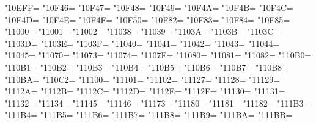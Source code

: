 \XeTeXcharclass"10EFF=\KclassCM
\XeTeXcharclass"10F46=\KclassCM
\XeTeXcharclass"10F47=\KclassCM
\XeTeXcharclass"10F48=\KclassCM
\XeTeXcharclass"10F49=\KclassCM
\XeTeXcharclass"10F4A=\KclassCM
\XeTeXcharclass"10F4B=\KclassCM
\XeTeXcharclass"10F4C=\KclassCM
\XeTeXcharclass"10F4D=\KclassCM
\XeTeXcharclass"10F4E=\KclassCM
\XeTeXcharclass"10F4F=\KclassCM
\XeTeXcharclass"10F50=\KclassCM
\XeTeXcharclass"10F82=\KclassCM
\XeTeXcharclass"10F83=\KclassCM
\XeTeXcharclass"10F84=\KclassCM
\XeTeXcharclass"10F85=\KclassCM
\XeTeXcharclass"11000=\KclassCM
\XeTeXcharclass"11001=\KclassCM
\XeTeXcharclass"11002=\KclassCM
\XeTeXcharclass"11038=\KclassCM
\XeTeXcharclass"11039=\KclassCM
\XeTeXcharclass"1103A=\KclassCM
\XeTeXcharclass"1103B=\KclassCM
\XeTeXcharclass"1103C=\KclassCM
\XeTeXcharclass"1103D=\KclassCM
\XeTeXcharclass"1103E=\KclassCM
\XeTeXcharclass"1103F=\KclassCM
\XeTeXcharclass"11040=\KclassCM
\XeTeXcharclass"11041=\KclassCM
\XeTeXcharclass"11042=\KclassCM
\XeTeXcharclass"11043=\KclassCM
\XeTeXcharclass"11044=\KclassCM
\XeTeXcharclass"11045=\KclassCM
\XeTeXcharclass"11070=\KclassCM
\XeTeXcharclass"11073=\KclassCM
\XeTeXcharclass"11074=\KclassCM
\XeTeXcharclass"1107F=\KclassCM
\XeTeXcharclass"11080=\KclassCM
\XeTeXcharclass"11081=\KclassCM
\XeTeXcharclass"11082=\KclassCM
\XeTeXcharclass"110B0=\KclassCM
\XeTeXcharclass"110B1=\KclassCM
\XeTeXcharclass"110B2=\KclassCM
\XeTeXcharclass"110B3=\KclassCM
\XeTeXcharclass"110B4=\KclassCM
\XeTeXcharclass"110B5=\KclassCM
\XeTeXcharclass"110B6=\KclassCM
\XeTeXcharclass"110B7=\KclassCM
\XeTeXcharclass"110B8=\KclassCM
\XeTeXcharclass"110BA=\KclassCM
\XeTeXcharclass"110C2=\KclassCM
\XeTeXcharclass"11100=\KclassCM
\XeTeXcharclass"11101=\KclassCM
\XeTeXcharclass"11102=\KclassCM
\XeTeXcharclass"11127=\KclassCM
\XeTeXcharclass"11128=\KclassCM
\XeTeXcharclass"11129=\KclassCM
\XeTeXcharclass"1112A=\KclassCM
\XeTeXcharclass"1112B=\KclassCM
\XeTeXcharclass"1112C=\KclassCM
\XeTeXcharclass"1112D=\KclassCM
\XeTeXcharclass"1112E=\KclassCM
\XeTeXcharclass"1112F=\KclassCM
\XeTeXcharclass"11130=\KclassCM
\XeTeXcharclass"11131=\KclassCM
\XeTeXcharclass"11132=\KclassCM
\XeTeXcharclass"11134=\KclassCM
\XeTeXcharclass"11145=\KclassCM
\XeTeXcharclass"11146=\KclassCM
\XeTeXcharclass"11173=\KclassCM
\XeTeXcharclass"11180=\KclassCM
\XeTeXcharclass"11181=\KclassCM
\XeTeXcharclass"11182=\KclassCM
\XeTeXcharclass"111B3=\KclassCM
\XeTeXcharclass"111B4=\KclassCM
\XeTeXcharclass"111B5=\KclassCM
\XeTeXcharclass"111B6=\KclassCM
\XeTeXcharclass"111B7=\KclassCM
\XeTeXcharclass"111B8=\KclassCM
\XeTeXcharclass"111B9=\KclassCM
\XeTeXcharclass"111BA=\KclassCM
\XeTeXcharclass"111BB=\KclassCM
